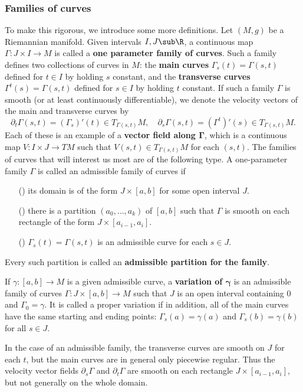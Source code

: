 \subsubsection{Families of curves}
To make this rigorous, we introduce some more definitions. Let $(M,g)$ be a Riemannian manifold. Given intervals $I,J\sub\R$, a continuous map $\Gamma:J\times I\to M$ 
is called a \textbf{one parameter family of curves}. Such a family defines two collections of curves in $M$: the \textbf{main curves} $\Gamma_s(t)=\Gamma(s,t)$ defined 
for $t\in I$ by holding $s$ constant, and the \textbf{transverse curves} $\Gamma^t(s)=\Gamma(s,t)$ defined for $s\in I$ by holding $t$ constant. If such a family $\Gamma$ 
is smooth (or at least continuously differentiable), we denote the velocity vectors of the main and transverse curves by
\[\partial_t\Gamma(s,t)=(\Gamma_s)'(t)\in T_{\Gamma(s,t)}M,\quad\partial_s\Gamma(s,t)=(\Gamma^t)'(s)\in T_{\Gamma(s,t)}M.\]
Each of these is an example of a \textbf{vector field along $\bm{\Gamma}$}, which is a continuous map $V:I\times J\to TM$ such that $V(s,t)\in T_{\Gamma(s,t)}M$ for each $(s,t)$.
The families of curves that will interest us most are of the following type. A one-parameter family $\Gamma$ is called an admissible family of curves if 
\begin{itemize}
\item[(\rmnum{1})] its domain is of the form $J\times[a,b]$ for some open interval $J$.
\item[(\rmnum{2})] there is a partition $(a_0,\dots,a_k)$ of $[a,b]$ such that $\Gamma$ is smooth on each rectangle of the form $J\times[a_{i-1},a_i]$.
\item[(\rmnum{3})] $\Gamma_s(t)=\Gamma(s,t)$ is an admissible curve for each $s\in J$.
\end{itemize}
Every such partition is called an \textbf{admissible partition for the family}.\par
If $\gamma:[a,b]\to M$ is a given admissible curve, a \textbf{variation of $\bm{\gamma}$} is an admissible family of curves $\Gamma:J\times[a,b]\to M$ such that $J$ is 
an open interval containing $0$ and $\Gamma_0=\gamma$. It is called a proper variation if in addition, all of the main curves have the same starting and ending points: 
$\Gamma_s(a)=\gamma(a)$ and $\Gamma_s(b)=\gamma(b)$ for all $s\in J$.\par
In the case of an admissible family, the transverse curves are smooth on $J$ for each $t$, but the main curves are in general only piecewise regular. Thus the velocity 
vector fields $\partial_s\Gamma$ and $\partial_t\Gamma$ are smooth on each rectangle $J\times[a_{i-1},a_i]$, but not generally on the whole domain.
